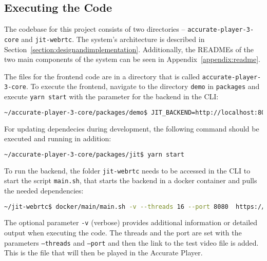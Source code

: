 \documentclass[../MasterThesis.tex]{subfiles}
\begin{document}
\subsection{Executing the Code} \label{subsection:runninghtecode}

The codebase for this project consists of two directories -- \texttt{accurate-player-3-core} and \texttt{jit-webrtc}. The system's architecture is described in Section~\ref{section:designandimplementation}. Additionally, the READMEs of the two main components of the system can be seen in Appendix~\ref{appendix:readme}.


The files for the frontend code are in a directory that is called \texttt{accurate-player-3-core}. To execute the frontend, navigate to the directory \texttt{demo} in \texttt{packages} and execute \texttt{yarn start} with the parameter for the backend in the CLI:
\begin{lstlisting}[language=bash, numbers=none]
	~/accurate-player-3-core/packages/demo$ JIT_BACKEND=http://localhost:8080 yarn start
\end{lstlisting}

For updating dependecies during development, the following command should be executed and running in addition: 
\begin{lstlisting}[language=bash, numbers=none]
	~/accurate-player-3-core/packages/jit$ yarn start
\end{lstlisting}



To run the backend, the folder \texttt{jit-webrtc} needs to be accessed in the CLI to start the script \texttt{main.sh}, that starts the backend in a docker container and pulls the needed dependencies:
\begin{lstlisting}[language=bash, numbers=none]
	~/jit-webrtc$ docker/main/main.sh -v --threads 16 --port 8080  https://s3.eu-central-1.amazonaws.com/accurate-player-demo-assets/timecode/sintel-2048-timecode-stereo.mp4
\end{lstlisting}

The optional parameter \texttt{-v} (verbose) provides additional information or detailed output when executing the code. The threads and the port are set with the parameters \texttt{--threads} and \texttt{--port} and then the link to the test video file is added. This is the file that will then be played in the Accurate Player.






	
	
	

	
	
\end{document}
